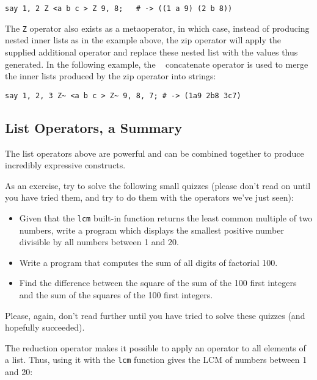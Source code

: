 \begin{verbatim}
say 1, 2 Z <a b c > Z 9, 8;   # -> ((1 a 9) (2 b 8))
\end{verbatim}

The \verb'Z' operator also exists as a metaoperator, in 
which case, instead of producing nested inner lists as 
in the example above, the zip operator will apply the 
supplied additional operator and replace these nested 
list with the values thus generated. In the following 
example, the ~ concatenate operator is used to merge 
the inner lists produced by the zip operator into 
strings:


\begin{verbatim}
say 1, 2, 3 Z~ <a b c > Z~ 9, 8, 7; # -> (1a9 2b8 3c7)
\end{verbatim}

\subsection{List Operators, a Summary}

The list operators above are powerful 
and can be combined together to produce incredibly 
expressive constructs.

As an exercise, try to solve the following small 
quizzes (please don't read on until you have tried 
them, and try to do them with the operators we've 
just seen):

\begin{itemize}
\item Given that the {\tt lcm} built-in function 
returns the least common multiple of two numbers, 
write a program which displays the smallest positive 
number divisible by all numbers between 1 and 20.

\item Write a program that computes the sum of all 
digits of factorial 100.

\item Find the difference between the square of the sum 
of the 100 first integers and the sum of the squares of 
the 100 first integers.
\end{itemize}

Please, again, don't read further until you have tried 
to solve these quizzes (and hopefully succeeded).

The reduction operator makes it possible to apply an 
operator to all elements of a list. Thus, using it 
with the {\tt lcm} function gives the LCM of numbers 
between 1 and 20:

